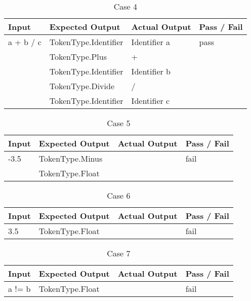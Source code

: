 \documentclass{article}
\begin{document}
\begin{table}[hp]
\begin{center}
\begin{tabular}{|l|l|l|l|}
\hline
Input & Expected Output & Actual Output & Pass / Fail \\
\hline
a + b / c & TokenType.Identifier & Identifier a & pass \\
 & TokenType.Plus & + & \\
 & TokenType.Identifier & Identifier b & \\
 & TokenType.Divide & / & \\
 & TokenType.Identifier & Identifier c & \\
\hline
\end{tabular}
\end{center}
\caption{Case 4}
\end{table}

\begin{table}[hp]
\begin{center}
\begin{tabular}{|l|l|l|l|}
\hline
Input & Expected Output & Actual Output & Pass / Fail \\
\hline
-3.5 & TokenType.Minus & & fail \\
 & TokenType.Float & & \\
\hline
\end{tabular}
\end{center}
\caption{Case 5}
\end{table}

\begin{table}[hp]
\begin{center}
\begin{tabular}{|l|l|l|l|}
\hline
Input & Expected Output & Actual Output & Pass / Fail \\
\hline
3.5 & TokenType.Float & & fail \\
\hline
\end{tabular}
\end{center}
\caption{Case 6}
\end{table}

\begin{table}[hp]
\begin{center}
\begin{tabular}{|l|l|l|l|}
\hline
Input & Expected Output & Actual Output & Pass / Fail \\
\hline
a != b & TokenType.Float & & fail \\
\hline
\end{tabular}
\end{center}
\caption{Case 7}
\end{table}
\end{document}
